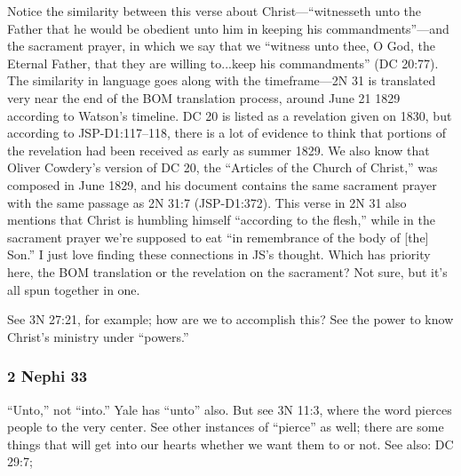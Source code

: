 		\begin{compactdesc}
		
		\item[7$\vert$]
		\begin{compactdesc}
		\item[and witnesseth unto the Father...in keeping his commandments] Notice the similarity between this verse about Christ---``witnesseth unto the Father that he would be obedient unto him in keeping his commandments''---and the sacrament prayer, in which we say that we ``witness unto thee, O God, the Eternal Father, that they are willing to...keep his commandments'' (DC 20:77). The similarity in language goes along with the timeframe---2N 31 is translated very near the end of the BOM translation process, around June 21 1829 according to Watson's timeline. DC 20 is listed as a revelation given on 1830, but according to JSP-D1:117--118, there is a lot of evidence to think that portions of the revelation had been received as early as summer 1829. We also know that Oliver Cowdery's version of DC 20, the ``Articles of the Church of Christ,'' was composed in June 1829, and his document contains the same sacrament prayer with the same passage as 2N 31:7 (JSP-D1:372). This verse in 2N 31 also mentions that Christ is humbling himself ``according to the flesh,'' while in the sacrament prayer we're supposed to eat ``in remembrance of the body of [the] Son.''
			I just love finding these connections in JS's thought. Which has priority here, the BOM translation or the revelation on the sacrament? Not sure, but it's all spun together in one.
		\end{compactdesc}
		
		\item[12$\vert$]
		\begin{compactdesc}
		\item[do the things which ye have seen me do] See 3N 27:21, for example; how are we to accomplish this? See the power to know Christ's ministry under ``powers.''
		\end{compactdesc}
		
		\end{compactdesc}
		
	\subsubsection{2 Nephi 33} %
	
		\begin{compactdesc}
		
		\item[1$\vert$]
		\begin{compactdesc}
		\item[unto the hearts] ``Unto,'' not ``into.'' Yale has ``unto'' also.
			But see 3N 11:3, where the word pierces people to the very center. See other instances of ``pierce'' as well; there are some things that will get into our hearts whether we want them to or not.
				See also:
					DC 29:7; 
		\end{compactdesc}
		
		\end{compactdesc}

